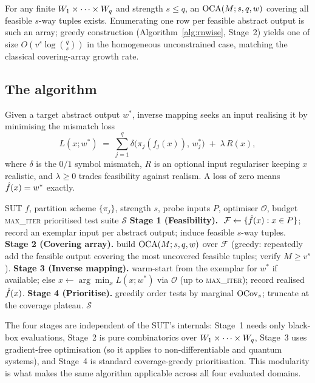 \begin{theorem}[Existence]
\label{thm:existence}
For any finite $W_1\times\cdots\times W_q$ and strength $s\le q$, an $\mathrm{OCA}(M;s,q,w)$ covering all
feasible $s$-way tuples exists. Enumerating one row per feasible abstract output
is such an array; greedy construction (Algorithm~\ref{alg:rnwise}, Stage~2) yields
one of size $O(v^{s}\log \binom{q}{s})$ in the homogeneous unconstrained case,
matching the classical covering-array growth rate.
\end{theorem}

\subsection{The \rnwise{} algorithm}

Given a target abstract output $w^{*}$, inverse mapping seeks an input realising
it by minimising the mismatch loss
\begin{equation}
\label{eq:loss}
L(x;w^{*}) \;=\; \sum_{j=1}^{q} \delta\!\bigl(\pi_j(f_j(x)),\, w^{*}_j\bigr)
\;+\; \lambda\, R(x),
\end{equation}
where $\delta$ is the $0/1$ symbol mismatch, $R$ is an optional input regulariser
keeping $x$ realistic, and $\lambda \ge 0$ trades feasibility against realism. A
loss of zero means $\hat{f}(x)=w^{*}$ exactly.

\begin{algorithm}[t]
\caption{\rnwise{} Output-Oriented Testing}
\label{alg:rnwise}
\begin{algorithmic}[1]
\REQUIRE SUT $f$, partition scheme $\{\pi_j\}$, strength $s$, probe inputs $P$,
optimiser $\mathcal{O}$, budget \textsc{max\_iter}
\ENSURE prioritised test suite $\mathcal{S}$
\STATE \textbf{Stage 1 (Feasibility).} $\;\mathcal{F}\leftarrow\{\hat{f}(x): x\in
P\}$; record an exemplar input per abstract output; induce feasible $s$-way tuples.
\STATE \textbf{Stage 2 (Covering array).} build $\mathrm{OCA}(M;s,q,w)$ over $\mathcal{F}$
(greedy: repeatedly add the feasible output covering the most uncovered feasible
tuples; verify $M \ge v^{s}$).
\STATE \textbf{Stage 3 (Inverse mapping).} 
  \STATE warm-start from the exemplar for $w^{*}$ if available;
  \STATE else $x \leftarrow \arg\min_x L(x;w^{*})$ via $\mathcal{O}$ (up to
  \textsc{max\_iter}); record realised $\hat{f}(x)$.
\ENDFOR
\STATE \textbf{Stage 4 (Prioritise).} greedily order tests by marginal
$\mathrm{OCov}_s$; truncate at the coverage plateau.
\RETURN $\mathcal{S}$
\end{algorithmic}
\end{algorithm}

The four stages are independent of the SUT's internals: Stage~1 needs only
black-box evaluations, Stage~2 is pure combinatorics over $W_1\times\cdots\times W_q$, Stage~3 uses
gradient-free optimisation (so it applies to non-differentiable and quantum
systems), and Stage~4 is standard coverage-greedy prioritisation. This modularity
is what makes the same algorithm applicable across all four evaluated domains.
